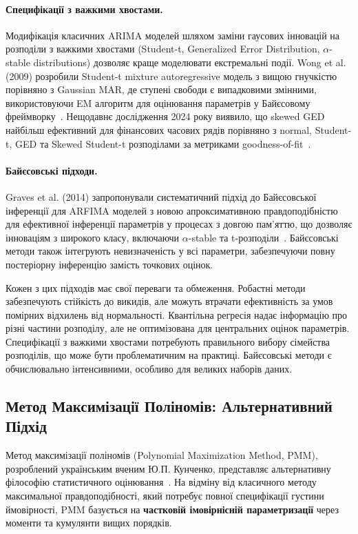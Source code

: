 \documentclass[12pt,a4paper]{article}
\begin{document}
	\paragraph{Специфікації з важкими хвостами.} Модифікація класичних ARIMA моделей шляхом заміни гаусових інновацій на розподіли з важкими хвостами (Student-t, Generalized Error Distribution, $\alpha$-stable distributions) дозволяє краще моделювати екстремальні події. Wong et al. (2009) розробили Student-t mixture autoregressive модель з вищою гнучкістю порівняно з Gaussian MAR, де ступені свободи є випадковими змінними, використовуючи EM алгоритм для оцінювання параметрів у Байєсовому фреймворку~\cite{wong2009student}. Нещодавнє дослідження 2024 року виявило, що skewed GED найбільш ефективний для фінансових часових рядів порівняно з normal, Student-t, GED та Skewed Student-t розподілами за метриками goodness-of-fit~\cite{palacios2024comparative}.
	
	\paragraph{Байєсовські підходи.} Graves et al. (2014) запропонували систематичний підхід до Байєсовської інференції для ARFIMA моделей з новою апроксимативною правдоподібністю для ефективної інференції параметрів у процесах з довгою пам'яттю, що дозволяє інноваціям з широкого класу, включаючи $\alpha$-stable та t-розподіли~\cite{graves2014efficient}. Байєсовські методи також інтегрують невизначеність у всі параметри, забезпечуючи повну постеріорну інференцію замість точкових оцінок.
	
	Кожен з цих підходів має свої переваги та обмеження. Робастні методи забезпечують стійкість до викидів, але можуть втрачати ефективність за умов помірних відхилень від нормальності. Квантільна регресія надає інформацію про різні частини розподілу, але не оптимізована для центральних оцінок параметрів. Специфікації з важкими хвостами потребують правильного вибору сімейства розподілів, що може бути проблематичним на практиці. Байєсовські методи є обчислювально інтенсивними, особливо для великих наборів даних.
	
	\subsection{Метод Максимізації Поліномів: Альтернативний Підхід}
	\label{subsec:pmm_intro}
	
	Метод максимізації поліномів (Polynomial Maximization Method, PMM), розроблений українським вченим Ю.П. Кунченко, представляє альтернативну філософію статистичного оцінювання~\cite{kunchenko1991estimation,kunchenko2002polynomial}. На відміну від класичного методу максимальної правдоподібності, який потребує повної специфікації густини ймовірності, PMM базується на \textbf{частковій імовірнісній параметризації} через моменти та кумулянти вищих порядків.
	
\end{document}
